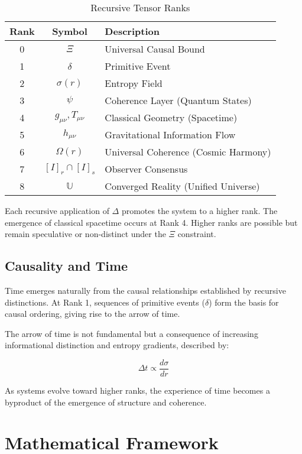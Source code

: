 \documentclass[12pt,a4paper]{article}
\begin{document}
\begin{table}[h]
\centering
\begin{tabular}{|c|c|l|}
\hline
\textbf{Rank} & \textbf{Symbol} & \textbf{Description} \\
\hline
0 & \(\Xi\) & Universal Causal Bound \\
1 & \(\delta\) & Primitive Event \\
2 & \(\sigma(r)\) & Entropy Field \\
3 & \(\psi\) & Coherence Layer (Quantum States) \\
4 & \(g_{\mu\nu}, T_{\mu\nu}\) & Classical Geometry (Spacetime) \\
5 & \(h_{\mu\nu}\) & Gravitational Information Flow \\
6 & \(\Omega(r)\) & Universal Coherence (Cosmic Harmony) \\
7 & \([I]_r \cap [I]_s\) & Observer Consensus \\
8 & \(\mathbb{U}\) & Converged Reality (Unified Universe) \\
\hline
\end{tabular}
\caption{Recursive Tensor Ranks}
\end{table}

Each recursive application of \(\Delta\) promotes the system to a higher rank. The emergence of classical spacetime occurs at Rank 4. Higher ranks are possible but remain speculative or non-distinct under the \(\Xi\) constraint.

\subsection{Causality and Time}

Time emerges naturally from the causal relationships established by recursive distinctions. At Rank 1, sequences of primitive events (\(\delta\)) form the basis for causal ordering, giving rise to the arrow of time.

The arrow of time is not fundamental but a consequence of increasing informational distinction and entropy gradients, described by:

\[
\Delta t \propto \frac{d\sigma}{dr}
\]

As systems evolve toward higher ranks, the experience of time becomes a byproduct of the emergence of structure and coherence.
\section{Mathematical Framework}
\end{document}
